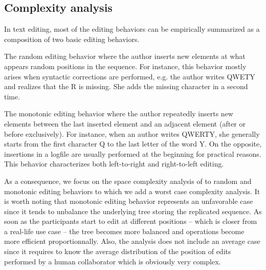 

\subsection{Complexity analysis}
\label{subsec:complexity}

In text editing, most of the editing behaviors can be empirically summarized
as a composition of two basic editing behaviors.
\begin{inparaenum}[(i)]
\item The random editing behavior where the author inserts new elements at what
  appears random positions in the sequence. For instance, this behavior mostly
  arises when syntactic corrections are performed, e.g. the author writes QWETY
  and realizes that the R is missing. She adds the missing character in a second
  time.
\item The monotonic editing behavior where the author repeatedly inserts new
  elements between the last inserted element and an adjacent element (after or
  before exclusively). For instance, when an author writes QWERTY, she generally
  starts from the first character Q to the last letter of the word Y. On the
  opposite, insertions in a logfile are usually performed at the beginning for
  practical reasons. This behavior characterizes both left-to-right and
  right-to-left editing.
\end{inparaenum}

As a consequence, we focus on the space complexity analysis of \LSEQ to random
and monotonic editing behaviors to which we add a worst case complexity
analysis. It is worth noting that monotonic editing behavior represents an
unfavorable case since it tends to unbalance the underlying tree storing the
replicated sequence. As soon as the participants start to edit at different
positions -- which is closer from a real-life use case -- the tree becomes more
balanced and operations become more efficient proportionnally. Also, the
analysis does not include an average case since it requires to know the average
distribution of the position of edits performed by a human collaborator which is
obviously very complex.

